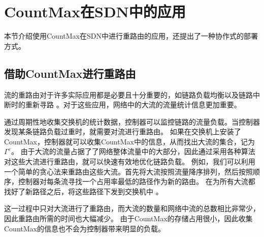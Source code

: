 \section{CountMax在SDN中的应用}
本节介绍使用CountMax在SDN中进行重路由的应用，还提出了一种协作式的部署方式。
\subsection{借助CountMax进行重路由}\label{sec:flowrerouting}
流的重路由对于许多实际应用都是必要且十分重要的，如链路负载均衡以及链路中断时的重新寻路\cite{xu2017incremental}
。对于这些应用，网络中的大流的流量统计信息更加重要\cite{xu2017scalable}。

通过周期性地收集交换机的统计数据，控制器可以监控链路的流量负载。当控制器发现某条链路负载过重时，就需要对流进行重路由。
如果在交换机上安装了CountMax，控制器就可以收集CountMax中的信息，从而找出大流的集合，记为 $\Gamma^e$。
由于大流的流量占据了了网络整体流量中的大部分，因此通过采用各种算法对这些大流进行重路由，就可以快速有效地优化链路负载。
例如，我们可以利用一个简单的贪心法来重路由这些大流。首先将大流按照流量降序排列，然后按照顺序，控制器对每条流寻找一个占用率最低的路径作为新的路由。
在为所有大流都找好了新路径之后，将这些路径下发到交换机中\cite{jin2014dynamic} \cite{xu2017joint}。

这一过程中只对大流进行了重路由，而大流的数量和网络中流的总数相比非常少，因此重路由所需的时间也大幅减少。
由于CountMax的存储占用很小，因此收集CountMax的信息也不会为控制器带来明显的负载。


